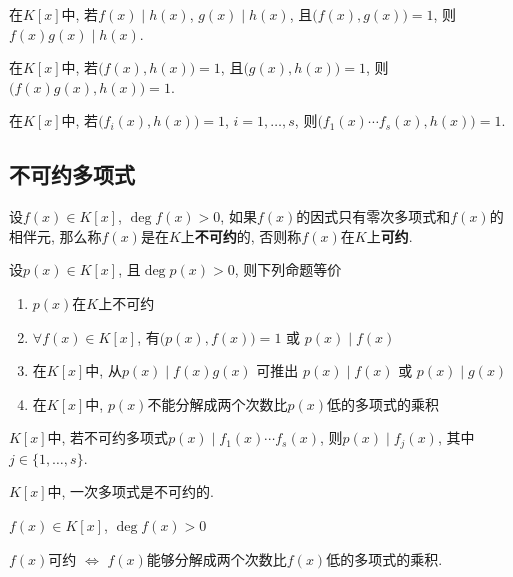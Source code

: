 \begin{Property}
在$K[x]$中, 若$f(x) \mid h(x)$, $g(x) \mid h(x)$, 且$\Big( f(x), g(x) \Big) = 1$, 则$f(x) g(x) \mid h(x)$.
\end{Property}

\begin{Property}
在$K[x]$中, 若$\Big( f(x), h(x) \Big) = 1$, 且$\Big( g(x), h(x) \Big) = 1$, 则$\Big( f(x) g(x), h(x) \Big) = 1$.
\end{Property}

\begin{Corollary}
在$K[x]$中, 若$\Big( f_i(x), h(x) \Big) = 1$, $i = 1, \dots, s$, 则$\Big( f_1(x)\cdots f_s(x), h(x) \Big) = 1$.
\end{Corollary}

\subsection{不可约多项式}

\begin{Definition}
设$f(x) \in K[x]$, $\deg f(x) > 0$, 如果$f(x)$的因式只有零次多项式和$f(x)$的相伴元, 那么称$f(x)$是在$K$上\textbf{不可约}的, 否则称$f(x)$在$K$上\textbf{可约}.
\end{Definition}

\begin{Theorem}
设$p(x) \in K[x]$, 且$\deg p(x) > 0$, 则下列命题等价
\begin{enumerate}[(1)]
\item $p(x)$在$K$上不可约
\item $\forall f(x) \in K[x]$, 有$\Big( p(x), f(x) \Big) = 1$ 或 $p(x) \mid f(x)$
\item 在$K[x]$中, 从$p(x) \mid f(x) g(x)$ 可推出 $p(x) \mid f(x)$ 或 $p(x) \mid g(x)$
\item 在$K[x]$中, $p(x)$不能分解成两个次数比$p(x)$低的多项式的乘积
\end{enumerate}
\end{Theorem}

\begin{Corollary}
$K[x]$中, 若不可约多项式$p(x) \mid f_1(x) \cdots f_s(x)$, 则$p(x) \mid f_j(x)$, 其中$j \in \{ 1, \dots, s \}$.
\end{Corollary}

\begin{Corollary}
$K[x]$中, 一次多项式是不可约的.
\end{Corollary}

\begin{Corollary}
$f(x) \in K[x]$, $\deg f(x) > 0$
\begin{center}
$f(x)$可约 $\iff$ $f(x)$能够分解成两个次数比$f(x)$低的多项式的乘积.
\end{center}
\end{Corollary}

